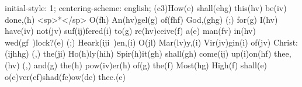initial-style: 1;
centering-scheme: english;
(c3)How(e) shall(ehg) this(hv) be(iv) done,(h) <sp>*</sp> O(fh) An(hv)gel(g) of(fhf) God,(ghg) (;) for(g) I(hv) have(iv) not(jv) suf(ij)fered(i) to(g) re(hv)ceive(f) a(e) man(fv) in(hv) wed(gf~)lock?(e) (;) Heark(iji~)en,(i) O(jl) Mar(lv)y,(i) Vir(jv)gin(i) of(jv) Christ:(ijhhg) (,) the(ji) Ho(h)ly(hih) Spir(h)it(gh) shall(gh) come(ij) up(i)on(hf) thee,(hv) (,) and(g) the(h) pow(iv)er(h) of(g) the(f) Most(hg) High(f) shall(e) o(e)ver(ef)shad(fe)ow(de) thee.(e)
